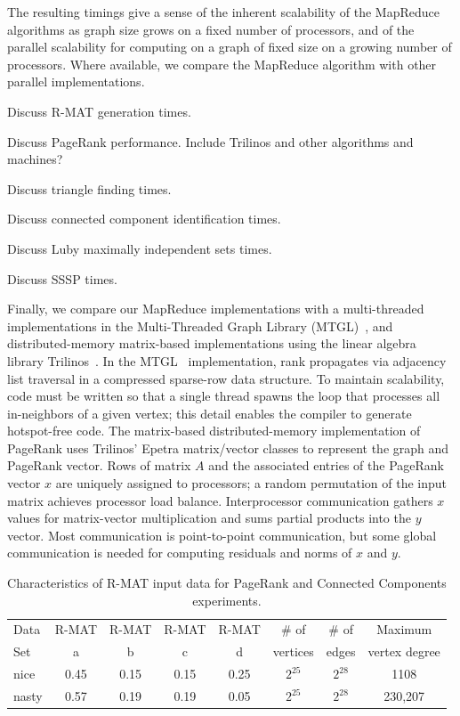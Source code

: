 The resulting timings give a sense of the inherent scalability of the
MapReduce algorithms as graph size grows on a fixed number of
processors, and of the parallel scalability for computing on a graph
of fixed size on a growing number of processors.  Where available, we
compare the MapReduce algorithm with other parallel implementations.

Discuss R-MAT generation times.

Discuss PageRank performance.  Include Trilinos and other
algorithms and machines?

Discuss triangle finding times.

Discuss connected component identification times.

Discuss Luby maximally independent sets times.

Discuss SSSP times.

Finally, we compare our MapReduce implementations with a multi-threaded
implementations
in the Multi-Threaded Graph Library (MTGL)~\cite{MTGL}, and
distributed-memory matrix-based implementations using the linear
algebra library Trilinos~\cite{Trilinos-Overview}.
In the MTGL~\cite{MTGL} implementation,
rank propagates via adjacency list traversal
in a compressed sparse-row data structure.
To maintain scalability, code must
be written so that a single thread spawns the loop that processes all
in-neighbors of a given vertex; this detail enables the compiler to generate
hotspot-free code.
The matrix-based distributed-memory implementation of PageRank
uses Trilinos' Epetra matrix/vector classes to represent the graph and
PageRank vector.
Rows of matrix $A$ and the associated entries of the PageRank vector $x$
are uniquely assigned to processors; a random permutation of the input
matrix achieves processor load balance.
Interprocessor communication gathers $x$ values for matrix-vector
multiplication and sums partial products into the $y$ vector.
Most communication is point-to-point communication,
but some global communication is needed for computing
residuals and norms of $x$ and $y$.

\begin{table}
\begin{tabular}{|l|c|c|c|c|c|c|c|}
\hline
Data & R-MAT  & R-MAT  & R-MAT  & R-MAT  & \# of    & \# of & Maximum \\
Set  & a      & b      & c      & d      & vertices & edges & vertex degree\\
\hline
nice  & 0.45 & 0.15 & 0.15 & 0.25 & $2^{25}$ & $2^{28}$ & 1108 \\
nasty & 0.57 & 0.19 & 0.19 & 0.05 & $2^{25}$ & $2^{28}$ & 230,207\\
\hline
\end{tabular}
\caption{Characteristics of R-MAT input data for PageRank and Connected
Components experiments.}
\label{t:rmat}
\end{table}

